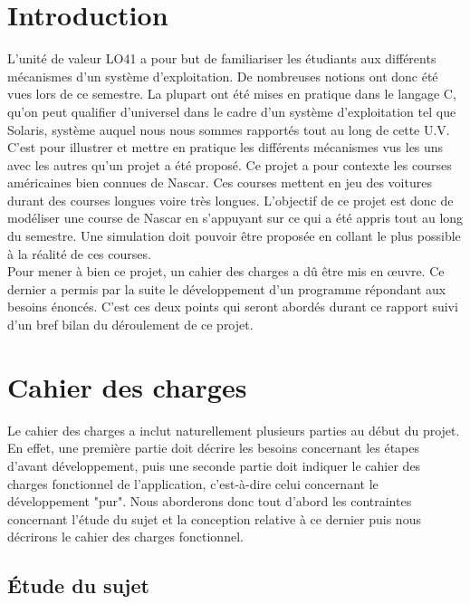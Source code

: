 \documentclass[a4paper, 11pt]{article}
\begin{document}
	\newpage
	
	
	\newpage
	
	\section*{Introduction}
	
	L'unité de valeur LO41 a pour but de familiariser les étudiants aux différents mécanismes d'un système d'exploitation. De nombreuses notions ont donc été vues lors de ce semestre. La plupart ont été mises en pratique dans le langage C, qu'on peut qualifier d'universel dans le cadre d'un système d'exploitation tel que Solaris, système auquel nous nous sommes rapportés tout au long de cette U.V. C'est pour illustrer et mettre en pratique les différents mécanismes vus les uns avec les autres qu'un projet a été proposé. Ce projet a pour contexte les courses américaines bien connues de Nascar. Ces courses mettent en jeu des voitures durant des courses longues voire très longues. L'objectif de ce projet est donc de modéliser une course de Nascar en s'appuyant sur ce qui a été appris tout au long du semestre. Une simulation doit pouvoir être proposée en collant le plus possible à la réalité de ces courses. \\
	Pour mener à bien ce projet, un cahier des charges a dû être mis en œuvre. Ce dernier a permis par la suite le développement d'un programme répondant aux besoins énoncés. C'est ces deux points qui seront abordés durant ce rapport suivi d'un bref bilan du déroulement de ce projet.
	
	
	\newpage
	
	\section{Cahier des charges}
	
	Le cahier des charges a inclut naturellement plusieurs parties au début du projet. En effet, une première partie doit décrire les besoins concernant les étapes d'avant développement, puis une seconde partie doit indiquer le cahier des charges fonctionnel de l'application, c'est-à-dire celui concernant le développement "pur". Nous aborderons donc tout d'abord les contraintes concernant l'étude du sujet et la conception relative à ce dernier puis nous décrirons le cahier des charges fonctionnel.
	
		\subsection{Étude du sujet}
		
\end{document}
